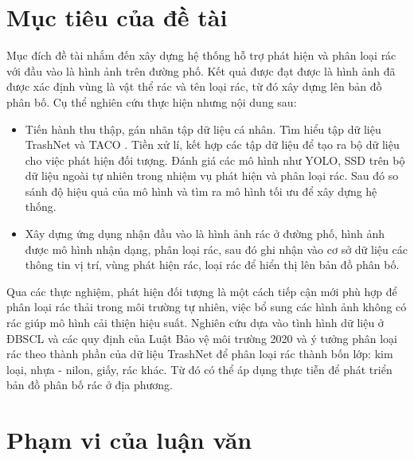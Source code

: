 \documentclass[../the.tex]{subfiles}
\begin{document}
\section{Mục tiêu của đề tài}
\label{muc_tieu}


{\fontsize{13}{12} \selectfont

Mục đích đề tài nhắm đến xây dựng hệ thống hỗ trợ phát hiện và phân loại rác với đầu vào là hình ảnh trên đường phố. Kết quả được đạt được là hình ảnh đã được xác định vùng là vật thể rác và tên loại rác, từ đó xây dựng lên bản đồ phân bố. Cụ thể nghiên cứu thực hiện nhưng nội dung sau:

\begin{itemize}
  \item Tiến hành thu thập, gán nhãn tập dữ liệu cá nhân. Tìm hiểu tập dữ liệu TrashNet \cite{yang2016classification} và TACO \cite{proença2020taco}. Tiền xử lí, kết hợp các tập dữ liệu để tạo ra bộ dữ liệu cho việc phát hiện đối tượng.
  Đánh giá các mô hình như YOLO, SSD trên bộ dữ liệu ngoài tự nhiên trong nhiệm vụ phát hiện và phân loại rác. Sau đó so sánh độ hiệu quả của mô hình và tìm ra mô hình tối ưu để xây dựng hệ thống.
  
  \item Xây dựng ứng dụng nhận đầu vào là hình ảnh rác ở đường phố, hình ảnh được mô hình nhận dạng, phân loại rác, sau đó ghi nhận vào cơ sở dữ liệu các thông tin vị trí, vùng phát hiện rác, loại rác để hiển thị lên bản đồ phân bố.
 
\end{itemize}

}

{\fontsize{13}{12} \selectfont

Qua các thực nghiệm, phát hiện đối tượng là một cách tiếp cận mới phù hợp để phân loại rác thải trong môi trường tự nhiên, việc bổ sung các hình ảnh không có rác giúp mô hình cải thiện hiệu suất. 
Nghiên cứu dựa vào tình hình dữ liệu ở ĐBSCL và các quy định của Luật Bảo vệ môi trường 2020 và ý tưởng phân loại rác theo thành phần của dữ liệu TrashNet để phân loại rác thành bốn lớp: kim loại, nhựa - nilon, giấy, rác khác. Từ đó có thể áp dụng thực tiễn để phát triển bản đồ phân bố rác ở địa phương. 

}


\section{Phạm vi của luận văn}
\label{pham_vi}
\end{document}

